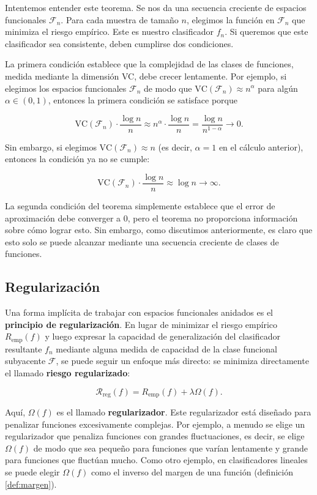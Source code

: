 \documentclass{report}
\begin{document}
Intentemos entender este teorema. Se nos da una secuencia creciente de espacios funcionales \(\mathcal{F}_n\). 
Para cada muestra de tamaño \(n\), elegimos la función en \(\mathcal{F}_n\) que minimiza el riesgo empírico. 
Este es nuestro clasificador \(f_n\). Si queremos que este clasificador sea consistente, deben cumplirse dos 
condiciones.\newline

La primera condición establece que la complejidad de las clases de funciones, medida mediante la dimensión VC, 
debe crecer lentamente. Por ejemplo, si elegimos los espacios funcionales \(\mathcal{F}_n\) de modo que 
\(\text{VC}(\mathcal{F}_n) \approx n^\alpha\) para algún \(\alpha \in (0,1)\), entonces la primera condición 
se satisface porque

\[
\text{VC}(\mathcal{F}_n) \cdot \frac{\log n}{n} \approx n^\alpha \cdot \frac{\log n}{n} = \frac{\log n}{n^{1-\alpha}} \to 0.
\]

Sin embargo, si elegimos \(\text{VC}(\mathcal{F}_n) \approx n\) (es decir, \(\alpha = 1\) en el cálculo anterior), 
entonces la condición ya no se cumple:

\[
\text{VC}(\mathcal{F}_n) \cdot \frac{\log n}{n} \approx \log n \to \infty.
\]

La segunda condición del teorema simplemente establece que el error de aproximación debe converger a \(0\), pero 
el teorema no proporciona información sobre cómo lograr esto. Sin embargo, como discutimos anteriormente, es claro 
que esto solo se puede alcanzar mediante una secuencia creciente de clases de funciones.\newline

\subsection{Regularización}

Una forma implícita de trabajar con espacios funcionales anidados es el \textbf{principio de regularización}. 
En lugar de minimizar el riesgo empírico \(R_{\text{emp}}(f)\) y luego expresar la capacidad de generalización 
del clasificador resultante \(f_n\) mediante alguna medida de capacidad de la clase funcional subyacente 
\(\mathcal{F}\), se puede seguir un enfoque más directo: se minimiza directamente el llamado \textbf{riesgo 
regularizado}:

\[
\mathcal{R}_{\text{reg}}(f) = R_{\text{emp}}(f) + \lambda \Omega(f).
\]

Aquí, \(\Omega(f)\) es el llamado \textbf{regularizador}. Este regularizador está diseñado para penalizar 
funciones excesivamente complejas. Por ejemplo, a menudo se elige un regularizador que penaliza funciones con 
grandes fluctuaciones, es decir, se elige \(\Omega(f)\) de modo que sea pequeño para funciones que varían 
lentamente y grande para funciones que fluctúan mucho. Como otro ejemplo, en clasificadores lineales se puede 
elegir \(\Omega(f)\) como el inverso del margen de una función (definición \ref{def:margen}).\newline
\end{document}
